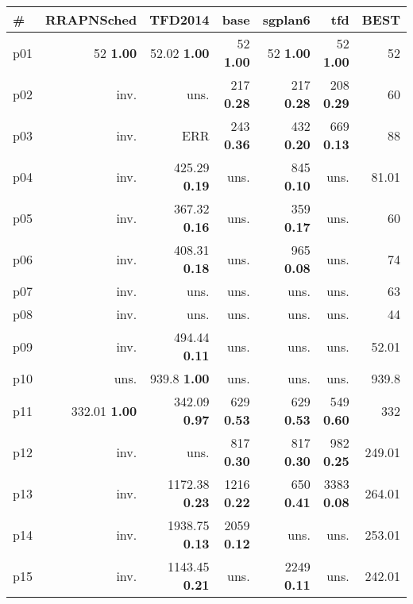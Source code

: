 \begin{tabular}{|l|rrrrr|r|}
\hline
\textbf{\#} & \textbf{RRAPNSched} & \textbf{TFD2014} & \textbf{base} & \textbf{sgplan6} & \textbf{tfd} & \textbf{BEST}\\
\hline
p01 & {\footnotesize 52} \textbf{1.00} & {\footnotesize 52.02} \textbf{1.00} & {\footnotesize 52} \textbf{1.00} & {\footnotesize 52} \textbf{1.00} & {\footnotesize 52} \textbf{1.00} & 52\\
p02 & inv. & uns. & {\footnotesize 217} \textbf{0.28} & {\footnotesize 217} \textbf{0.28} & {\footnotesize 208} \textbf{0.29} & 60\\
p03 & inv. & ERR & {\footnotesize 243} \textbf{0.36} & {\footnotesize 432} \textbf{0.20} & {\footnotesize 669} \textbf{0.13} & 88\\
p04 & inv. & {\footnotesize 425.29} \textbf{0.19} & uns. & {\footnotesize 845} \textbf{0.10} & uns. & 81.01\\
p05 & inv. & {\footnotesize 367.32} \textbf{0.16} & uns. & {\footnotesize 359} \textbf{0.17} & uns. & 60\\
p06 & inv. & {\footnotesize 408.31} \textbf{0.18} & uns. & {\footnotesize 965} \textbf{0.08} & uns. & 74\\
p07 & inv. & uns. & uns. & uns. & uns. & 63\\
p08 & inv. & uns. & uns. & uns. & uns. & 44\\
p09 & inv. & {\footnotesize 494.44} \textbf{0.11} & uns. & uns. & uns. & 52.01\\
p10 & uns. & {\footnotesize 939.8} \textbf{1.00} & uns. & uns. & uns. & 939.8\\
p11 & {\footnotesize 332.01} \textbf{1.00} & {\footnotesize 342.09} \textbf{0.97} & {\footnotesize 629} \textbf{0.53} & {\footnotesize 629} \textbf{0.53} & {\footnotesize 549} \textbf{0.60} & 332\\
p12 & inv. & uns. & {\footnotesize 817} \textbf{0.30} & {\footnotesize 817} \textbf{0.30} & {\footnotesize 982} \textbf{0.25} & 249.01\\
p13 & inv. & {\footnotesize 1172.38} \textbf{0.23} & {\footnotesize 1216} \textbf{0.22} & {\footnotesize 650} \textbf{0.41} & {\footnotesize 3383} \textbf{0.08} & 264.01\\
p14 & inv. & {\footnotesize 1938.75} \textbf{0.13} & {\footnotesize 2059} \textbf{0.12} & uns. & uns. & 253.01\\
p15 & inv. & {\footnotesize 1143.45} \textbf{0.21} & uns. & {\footnotesize 2249} \textbf{0.11} & uns. & 242.01\\

\end{tabular}
